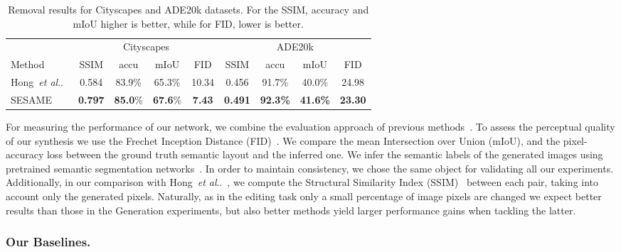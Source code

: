 \documentclass[runningheads]{llncs}
\makeatletter
\DeclareRobustCommand\onedot{\futurelet\@let@token\@onedot}
\def\@onedot{\ifx\@let@token.\else.\null\fi\xspace}
\def\etal{\emph{et al}\onedot}
\def\hong{Hong~\etal~\cite{hong2018learning}}
\makeatother
\begin{document}
\begin{table}[t]
\begin{center}
\caption{Removal results for Cityscapes and ADE20k datasets. For the SSIM, accuracy and mIoU higher is better, while for FID, lower is better.}
\label{table:removal}
\begin{tabular}{l|cccc|cccc}
\multicolumn{1}{l}{} &  \multicolumn{4}{c}{Cityscapes} & \multicolumn{4}{c}{ADE20k} \\
\cline{2-9}
Method & SSIM & accu  & mIoU  & FID  & SSIM  & accu  & mIoU   & FID  \\
\hline
\hong{} & 0.584 & 83.9\% & 65.3\% & 10.34 &  0.456  & 91.7\% & 40.0\% &  24.98  \\
SESAME & \textbf{0.797} & \textbf{85.0}\% & \textbf{67.6}\% & \textbf{7.43}  & \textbf{0.491} & \textbf{92.3\%} & \textbf{41.6\%} &  \textbf{23.30} \\
\end{tabular}
\end{center}

\end{table}

For measuring the performance of our network, we combine the evaluation approach of previous methods~\cite{hong2018learning,park2019SPADE}.
To assess the perceptual quality of our synthesis we use the Frechet Inception Distance (FID)~\cite{NIPS2017_7240}.
We compare the mean Intersection over Union (mIoU), and the pixel-accuracy loss between the ground truth semantic layout and the inferred one. We infer the semantic labels of the generated images using pretrained semantic segmentation networks~\cite{Yu2016,Yu2017,zhou2016semantic,zhou2017scene}.
In order to maintain consistency, we chose the same object for validating all our experiments.
Additionally, in our comparison with \hong{}, 
we compute the Structural Similarity Index (SSIM)~\cite{wang2004image} between each  pair, taking into account only the generated pixels.
Naturally, as in the editing task only a small percentage of image pixels are changed we expect better results than those in the Generation experiments, but also better methods yield larger performance gains when tackling the latter.

\subsubsection{Our Baselines.}
\label{ssc:baseline}
\end{document}
